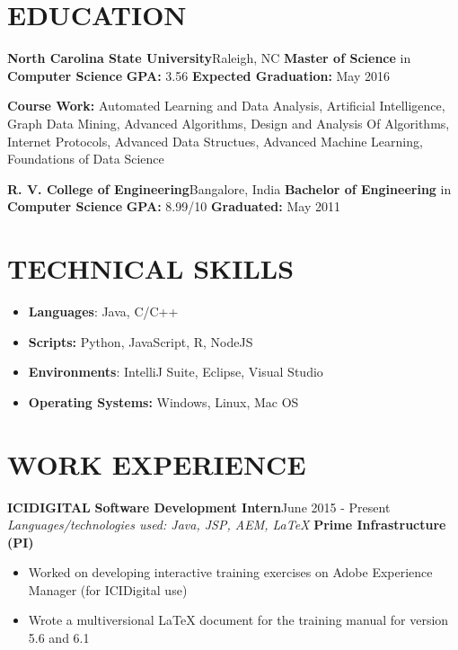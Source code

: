 \documentclass[11pt, letterpaper]{article}
\begin{document}
	\begin{multicols}{2}
		\section*{EDUCATION}
			\vspace{0.2cm}
			{\bfseries \large North Carolina State University}\hfill Raleigh, NC\newline
			{\bfseries Master of Science} in {\bfseries Computer Science} \newline
			{\bfseries GPA:} 3.56 \hfill {\bfseries Expected Graduation:} May 2016\par
			{\bfseries Course Work:} Automated Learning and Data Analysis, Artificial Intelligence, Graph Data Mining, Advanced Algorithms, Design and Analysis Of Algorithms, Internet Protocols, Advanced Data Structues, Advanced Machine Learning, Foundations of Data Science\newline
			\par
			{\bfseries \large R. V. College of Engineering}\hfill Bangalore, India\newline
			{\bfseries Bachelor of Engineering} in {\bfseries Computer Science} \newline
			{\bfseries GPA:} 8.99/10 \hfill {\bfseries Graduated:} May 2011

		\section*{TECHNICAL SKILLS}		
			\vspace{0.2cm}
			\begin{itemize}[nolistsep,leftmargin=*]
				\item \textbf{Languages}: Java, C/C++
				\item \textbf{Scripts:} Python, JavaScript, R, NodeJS
				\item \textbf{Environments}: IntelliJ Suite, Eclipse, Visual Studio
				\item \textbf{Operating Systems:} Windows, Linux, Mac OS
			\end{itemize}

		\section*{WORK EXPERIENCE}

			\vspace{0.2cm}
			{\bfseries ICIDIGITAL}\newline
			{\bfseries \small Software Development Intern}\hfill{June 2015 - Present}\newline			
				\textit{Languages/technologies used: Java, JSP, AEM, LaTeX}\newline
				{\bfseries Prime Infrastructure (PI)}
				\begin{itemize}[nolistsep,leftmargin=*]
					\item Worked on developing interactive training exercises on Adobe Experience Manager (for ICIDigital use)
					\item Wrote a multiversional LaTeX document for the training manual for version 5.6 and 6.1
				\end{itemize}



\end{multicols}
\end{document}
